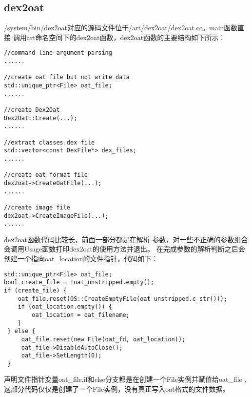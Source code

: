 \subsection{dex2oat}
/system/bin/dex2oat对应的源码文件位于/art/dex2oat/dex2oat.cc。main函数直接
调用art命名空间下的dex2oat函数，dex2oat函数的主要结构如下所示：
\begin{lstlisting}
//command-line argument parsing
......

//create oat file but not write data
std::unique_ptr<File> oat_file;
......

//create Dex2Oat
Dex2Oat::Create(...);
......

//extract classes.dex file
std::vector<const DexFile*> dex_files;
......

//create oat format file
dex2oat->CreateOatFile(...);
......

//create image file
dex2oat->CreateImageFile(...);
......
\end{lstlisting}
dex2oat函数代码比较长，前面一部分都是在解析
参数，对一些不正确的参数组合会调用Usage函数打印dex2oat的使用方法并退出。
在完成参数的解析判断之后会创建一个指向oat\_location的文件指针，代码如下：
\begin{lstlisting}
std::unique_ptr<File> oat_file;
bool create_file = !oat_unstripped.empty();
if (create_file) {
	oat_file.reset(OS::CreateEmptyFile(oat_unstripped.c_str()));
	if (oat_location.empty()) {
		oat_location = oat_filename;
	}
 } else {
	 oat_file.reset(new File(oat_fd, oat_location));
	 oat_file->DisableAutoClose();
	 oat_file->SetLength(0);
 }
\end{lstlisting}
声明文件指针变量oat\_file,if和else分支都是在创建一个File实例并赋值给oat\_file
,这部分代码仅仅是创建了一个File实例，没有真正写入oat格式的文件数据。

